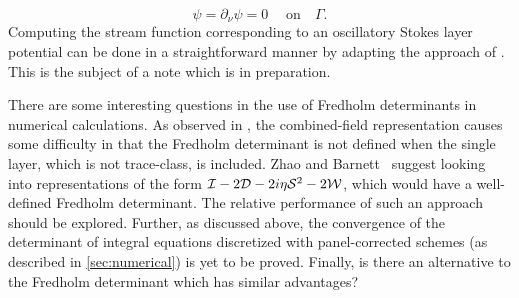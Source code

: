 \begin{equation*}
  \psi = \partial_\nu \psi = 0 \; \quad \textrm{on} \quad \Gamma.
\end{equation*}
Computing the stream function corresponding
to an oscillatory Stokes layer potential can be
done in a straightforward manner
by adapting the approach of \cite{rachh2017integral}.
%
This is the subject of a note which is in
preparation.

There are some interesting questions in the
use of Fredholm determinants in numerical
calculations.
%
As observed in \cite{zhao2015robust}, the
combined-field representation causes some
difficulty in that the Fredholm determinant
is not defined when the single layer, which
is not trace-class, is included.
%
Zhao and Barnett~\cite{zhao2015robust}
suggest looking into
representations of the form $\mathcal I-2{\mathcal D}
-2i\eta{\mathcal S}^2-2{\mathcal W}$,
which would have a well-defined Fredholm
determinant.
%
The relative performance of
such an approach should be explored.
%
Further, as discussed above, the
convergence of the determinant of
integral equations discretized with
panel-corrected schemes (as described in
\cref{sec:numerical}) is yet to be proved.
%
Finally, is there an alternative
to the Fredholm determinant which
has similar advantages?
%


